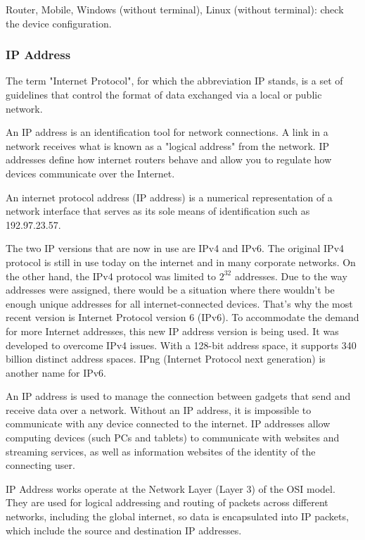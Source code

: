 \documentclass{article}
\begin{document}
Router, Mobile, Windows (without terminal), Linux (without terminal): check the device configuration.

\subsubsection{IP Address}

The term "Internet Protocol", for which the abbreviation IP stands, is a set of guidelines that control the format of data exchanged via a local or public network.

An IP address is an identification tool for network connections. A link in a network receives what is known as a "logical address" from the network. IP addresses define how internet routers behave and allow you to regulate how devices communicate over the Internet.

An internet protocol address (IP address) is a numerical representation of a network interface that serves as its sole means of identification such as 192.97.23.57.

The two IP versions that are now in use are IPv4 and IPv6. The original IPv4 protocol is still in use today on the internet and in many corporate networks. On the other hand, the IPv4 protocol was limited to $2^{32}$ addresses. Due to the way addresses were assigned, there would be a situation where there wouldn't be enough unique addresses for all internet-connected devices. That's why the most recent version is Internet Protocol version 6 (IPv6). To accommodate the demand for more Internet addresses, this new IP address version is being used. It was developed to overcome IPv4 issues. With a 128-bit address space, it supports 340 billion distinct address spaces. IPng (Internet Protocol next generation) is another name for IPv6.

An IP address is used to manage the connection between gadgets that send and receive data over a network. Without an IP address, it is impossible to communicate with any device connected to the internet. IP addresses allow computing devices (such PCs and tablets) to communicate with websites and streaming services, as well as information websites of the identity of the connecting user.

IP Address works operate at the Network Layer (Layer 3) of the OSI model. They are used for logical addressing and routing of packets across different networks, including the global internet, so data is encapsulated into IP packets, which include the source and destination IP addresses.
\end{document}
